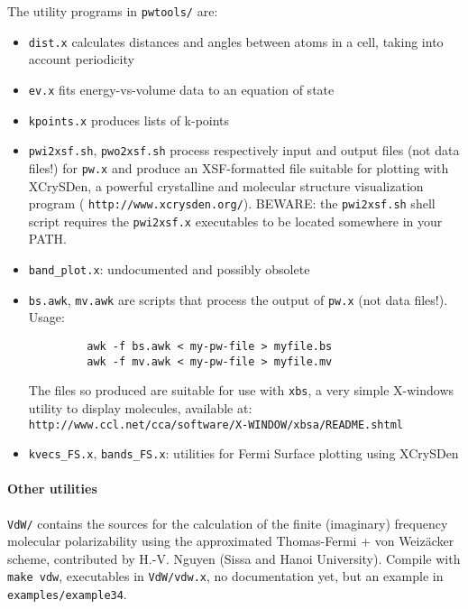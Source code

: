 \documentclass[12pt,a4paper]{article}
\def\pw.x{\texttt{pw.x}}
\begin{document}
The utility programs in  \texttt{pwtools/} are:
\begin{itemize}
\item  \texttt{dist.x} calculates distances and angles between atoms in a cell,
  taking into account periodicity 
\item  \texttt{ev.x} fits energy-vs-volume data to an equation of state
\item  \texttt{kpoints.x} produces lists of k-points
\item  \texttt{pwi2xsf.sh},  \texttt{pwo2xsf.sh} process respectively input and output
  files (not data files!) for \pw.x and produce an XSF-formatted file
  suitable for plotting with XCrySDen, a powerful crystalline and
  molecular structure visualization program
  ( \texttt{http://www.xcrysden.org/}). BEWARE: the  \texttt{pwi2xsf.sh} shell script
  requires the  \texttt{pwi2xsf.x} executables to be located somewhere in your PATH. 
\item  \texttt{band\_plot.x}: undocumented and possibly obsolete 
\item  \texttt{bs.awk},  \texttt{mv.awk} are scripts that process the output of \pw.x (not
data files!). Usage: 
\begin{verbatim}
         awk -f bs.awk < my-pw-file > myfile.bs
         awk -f mv.awk < my-pw-file > myfile.mv
\end{verbatim}
The files so produced are suitable for use with  \texttt{xbs}, a very simple
X-windows utility to display molecules, available at:\\
 \texttt{http://www.ccl.net/cca/software/X-WINDOW/xbsa/README.shtml}
\item  \texttt{kvecs\_FS.x},  \texttt{bands\_FS.x}: utilities for Fermi Surface plotting
  using XCrySDen
\end{itemize}

\paragraph{Other utilities}
 \texttt{VdW/} contains the sources for the calculation of the finite (imaginary)
frequency molecular polarizability using the approximated Thomas-Fermi
+ von Weiz\"acker scheme, contributed by H.-V. Nguyen (Sissa and
Hanoi University). Compile with \texttt{make vdw}, executables in  
\texttt{VdW/vdw.x}, no
documentation yet, but an example in  \texttt{examples/example34}.
\end{document}
